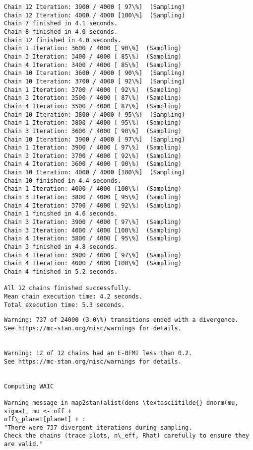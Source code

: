 \documentclass[11pt]{article}
\begin{document}
\begin{Verbatim}[commandchars=\\\{\}]
Chain 12 Iteration: 3900 / 4000 [ 97\%]  (Sampling)
Chain 12 Iteration: 4000 / 4000 [100\%]  (Sampling)
Chain 7 finished in 4.1 seconds.
Chain 8 finished in 4.0 seconds.
Chain 12 finished in 4.0 seconds.
Chain 1 Iteration: 3600 / 4000 [ 90\%]  (Sampling)
Chain 3 Iteration: 3400 / 4000 [ 85\%]  (Sampling)
Chain 4 Iteration: 3400 / 4000 [ 85\%]  (Sampling)
Chain 10 Iteration: 3600 / 4000 [ 90\%]  (Sampling)
Chain 10 Iteration: 3700 / 4000 [ 92\%]  (Sampling)
Chain 1 Iteration: 3700 / 4000 [ 92\%]  (Sampling)
Chain 3 Iteration: 3500 / 4000 [ 87\%]  (Sampling)
Chain 4 Iteration: 3500 / 4000 [ 87\%]  (Sampling)
Chain 10 Iteration: 3800 / 4000 [ 95\%]  (Sampling)
Chain 1 Iteration: 3800 / 4000 [ 95\%]  (Sampling)
Chain 3 Iteration: 3600 / 4000 [ 90\%]  (Sampling)
Chain 10 Iteration: 3900 / 4000 [ 97\%]  (Sampling)
Chain 1 Iteration: 3900 / 4000 [ 97\%]  (Sampling)
Chain 3 Iteration: 3700 / 4000 [ 92\%]  (Sampling)
Chain 4 Iteration: 3600 / 4000 [ 90\%]  (Sampling)
Chain 10 Iteration: 4000 / 4000 [100\%]  (Sampling)
Chain 10 finished in 4.4 seconds.
Chain 1 Iteration: 4000 / 4000 [100\%]  (Sampling)
Chain 3 Iteration: 3800 / 4000 [ 95\%]  (Sampling)
Chain 4 Iteration: 3700 / 4000 [ 92\%]  (Sampling)
Chain 1 finished in 4.6 seconds.
Chain 3 Iteration: 3900 / 4000 [ 97\%]  (Sampling)
Chain 3 Iteration: 4000 / 4000 [100\%]  (Sampling)
Chain 4 Iteration: 3800 / 4000 [ 95\%]  (Sampling)
Chain 3 finished in 4.8 seconds.
Chain 4 Iteration: 3900 / 4000 [ 97\%]  (Sampling)
Chain 4 Iteration: 4000 / 4000 [100\%]  (Sampling)
Chain 4 finished in 5.2 seconds.

All 12 chains finished successfully.
Mean chain execution time: 4.2 seconds.
Total execution time: 5.3 seconds.

    \end{Verbatim}

    \begin{Verbatim}[commandchars=\\\{\}]
Warning: 737 of 24000 (3.0\%) transitions ended with a divergence.
See https://mc-stan.org/misc/warnings for details.


Warning: 12 of 12 chains had an E-BFMI less than 0.2.
See https://mc-stan.org/misc/warnings for details.


Computing WAIC

Warning message in map2stan(alist(dens \textasciitilde{} dnorm(mu, sigma), mu <- off +
off\_planet[planet] + :
"There were 737 divergent iterations during sampling.
Check the chains (trace plots, n\_eff, Rhat) carefully to ensure they are valid."
    \end{Verbatim}
\end{document}
